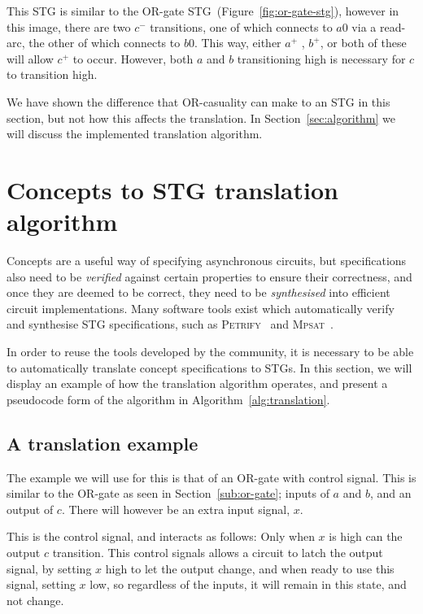 \documentclass[british,conference,compsoc]{IEEEtran}
\newcommand{\noun}[1]{\textsc{#1}}
\begin{document}
This STG is similar to the OR-gate STG~(Figure~\ref{fig:or-gate-stg}), however
in this image, there are two $c^{-}$ transitions, one of which connects to $a0$
via a read-arc, the other of which connects to $b0$. This way, either $a^{+}$ 
, $b^{+}$, or both of these will allow $c^{+}$ to occur. However, both $a$ and
$b$ transitioning high is necessary for $c$ to transition high. 

We have shown the difference that OR-casuality can make to an STG in this
section, but not how this affects the translation. In Section~\ref{sec:algorithm} we 
will discuss the implemented translation algorithm. 

\section{Concepts to STG translation algorithm\label{sec:algorithm}}

Concepts are a useful way of specifying asynchronous circuits, but
specifications also need to be \emph{verified} against certain properties to
ensure their correctness, and once they are deemed to be correct, they need to
be \emph{synthesised} into efficient circuit implementations. Many software
tools exist which automatically verify and synthesise STG specifications,
such as \noun{Petrify}~\cite{Cortadella} and
\noun{Mpsat}~\cite{khomenko2004detecting}.

In order to reuse the tools developed by the community, it is
necessary to be able to automatically translate concept specifications to STGs.
In this section, we will display an example of how the translation algorithm 
operates, and present a pseudocode form of the algorithm in Algorithm~\ref{alg:translation}. 


\subsection{A translation example}

The example we will use for this is that of an OR-gate with control signal. 
This is similar to the OR-gate as seen in Section~\ref{sub:or-gate}; inputs
of $a$ and $b$, and an output of $c$. There will however be an extra 
input signal, $x$. 

This is the control signal, and interacts as follows:
Only when $x$ is high can the output $c$ transition. This control signals
allows a circuit to latch the output signal, by setting $x$ high to let
the output change, and when ready to use this signal, setting $x$ low,
so regardless of the inputs, it will remain in this state, and not change.
\end{document}
